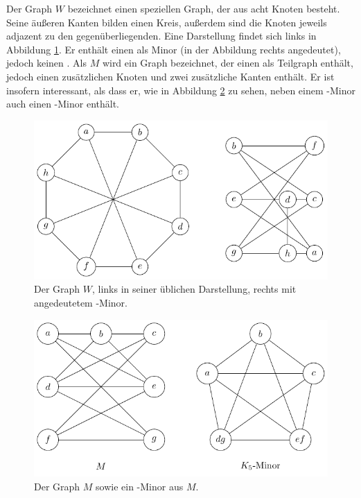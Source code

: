 Der Graph $W$ bezeichnet einen speziellen Graph, der aus acht Knoten besteht.
Seine äußeren Kanten bilden einen Kreis, außerdem sind die Knoten jeweils adjazent zu den gegenüberliegenden. Eine Darstellung findet sich links in Abbildung \ref{fig:W}.
Er enthält einen \kdd als Minor (in der Abbildung rechts angedeutet), jedoch keinen \kf.
Als $M$ wird ein Graph bezeichnet, der einen \kdd als Teilgraph enthält, jedoch einen zusätzlichen Knoten und zwei zusätzliche Kanten enthält.
Er ist insofern interessant, als dass er, wie in Abbildung \ref{fig:M} zu sehen, neben einem \kdd-Minor auch einen \kf-Minor enthält.
\begin{figure}[H]
  \centering
  \includegraphics[keepaspectratio]{bilder/W.pdf}
  \caption{Der Graph $W$, links in seiner üblichen Darstellung, rechts mit angedeutetem \kdd-Minor.}
  \label{fig:W}
\end{figure}

\begin{figure}[H]
  \centering
  \includegraphics[keepaspectratio]{bilder/M.pdf}
  \caption{Der Graph $M$ sowie ein \kf-Minor aus $M$.}
  \label{fig:M}
\end{figure}

